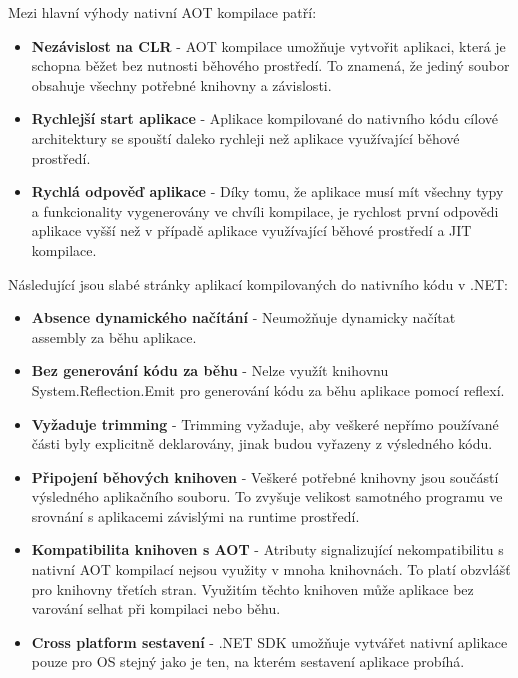 Mezi hlavní výhody nativní AOT kompilace patří:

\begin{itemize}
    \item  \textbf{Nezávislost na CLR} - AOT kompilace umožňuje vytvořit aplikaci, která je schopna běžet bez nutnosti běhového prostředí. To znamená, že jediný soubor obsahuje všechny potřebné knihovny a závislosti.
    \item \textbf{Rychlejší start aplikace} - Aplikace kompilované do nativního kódu cílové architektury se spouští daleko rychleji než aplikace využívající běhové prostředí.
    \item \textbf{Rychlá odpověď aplikace} - Díky tomu, že aplikace musí mít všechny typy a funkcionality vygenerovány ve chvíli kompilace, je rychlost první odpovědi aplikace vyšší než v případě aplikace využívající běhové prostředí a JIT kompilace.
\end{itemize}

Následující jsou slabé stránky aplikací kompilovaných do nativního kódu v .NET:

\begin{itemize}
    \item \textbf{Absence dynamického načítání} - Neumožňuje dynamicky načítat assembly za běhu aplikace.
    \item \textbf{Bez generování kódu za běhu} - Nelze využít knihovnu System.Reflection.Emit pro generování kódu za běhu aplikace pomocí reflexí.
    \item \textbf{Vyžaduje trimming} - Trimming vyžaduje, aby veškeré nepřímo používané části byly explicitně deklarovány, jinak budou vyřazeny z výsledného kódu.
    \item \textbf{Připojení běhových knihoven} - Veškeré potřebné knihovny jsou součástí výsledného aplikačního souboru. To zvyšuje velikost samotného programu ve srovnání s aplikacemi závislými na runtime prostředí.
    \item \textbf{Kompatibilita knihoven s AOT} - Atributy signalizující nekompatibilitu s nativní AOT kompilací nejsou využity v mnoha knihovnách. To platí obzvlášť pro knihovny třetích stran. Využitím těchto knihoven může aplikace bez varování selhat při kompilaci nebo běhu.
    \item \textbf{Cross platform sestavení} - .NET SDK umožňuje vytvářet nativní aplikace pouze pro OS stejný jako je ten, na kterém sestavení aplikace probíhá.
\end{itemize}


